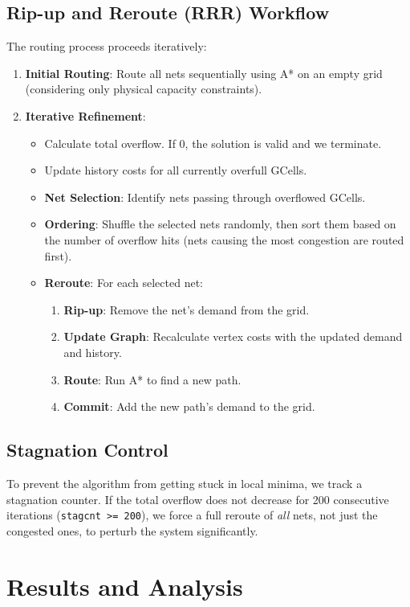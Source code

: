 \documentclass[a4paper,12pt]{article}
\begin{document}
\subsection{Rip-up and Reroute (RRR) Workflow}
The routing process proceeds iteratively:
\begin{enumerate}
    \item \textbf{Initial Routing}: Route all nets sequentially using A* on an empty grid (considering only physical capacity constraints).
    \item \textbf{Iterative Refinement}:
    \begin{itemize}
        \item Calculate total overflow. If 0, the solution is valid and we terminate.
        \item Update history costs for all currently overfull GCells.
        \item \textbf{Net Selection}: Identify nets passing through overflowed GCells.
        \item \textbf{Ordering}: Shuffle the selected nets randomly, then sort them based on the number of overflow hits (nets causing the most congestion are routed first).
        \item \textbf{Reroute}: For each selected net:
        \begin{enumerate}
            \item \textbf{Rip-up}: Remove the net's demand from the grid.
            \item \textbf{Update Graph}: Recalculate vertex costs with the updated demand and history.
            \item \textbf{Route}: Run A* to find a new path.
            \item \textbf{Commit}: Add the new path's demand to the grid.
        \end{enumerate}
    \end{itemize}
\end{enumerate}

\subsection{Stagnation Control}
To prevent the algorithm from getting stuck in local minima, we track a stagnation counter. If the total overflow does not decrease for 200 consecutive iterations (\texttt{stagcnt >= 200}), we force a full reroute of \textit{all} nets, not just the congested ones, to perturb the system significantly.

\section{Results and Analysis}
\end{document}
